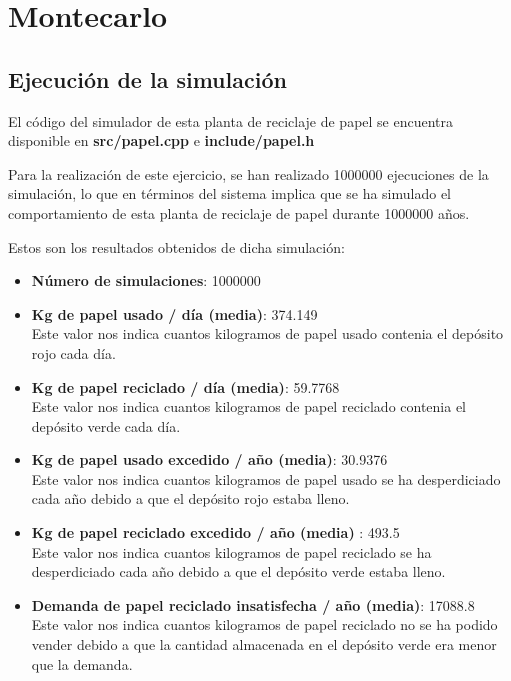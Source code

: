 \chapter{Montecarlo}

\section{Ejecución de la simulación}

El código del simulador de esta planta de reciclaje de papel se encuentra disponible en \textbf{src/papel.cpp} e \textbf{include/papel.h}

Para la realización de este ejercicio, se han realizado 1000000 ejecuciones de la simulación, lo que en términos del sistema implica que se ha simulado el comportamiento de esta planta de reciclaje de papel durante 1000000 años.

Estos son los resultados obtenidos de dicha simulación:

\begin{itemize}
	\item \textbf{Número de simulaciones}: 1000000
	\item \textbf{Kg de papel usado / día (media)}: 374.149\\
		Este valor nos indica cuantos kilogramos de papel usado contenia el depósito rojo cada día.
	\item \textbf{Kg de papel reciclado / día (media)}: 59.7768\\
		Este valor nos indica cuantos kilogramos de papel reciclado contenia el depósito verde cada día.
	\item \textbf{Kg de papel usado excedido / año (media)}: 30.9376\\
		Este valor nos indica cuantos kilogramos de papel usado se ha desperdiciado cada año debido a que el depósito rojo estaba lleno.
	\item \textbf{Kg de papel reciclado excedido / año (media) }: 493.5\\
		Este valor nos indica cuantos kilogramos de papel reciclado se ha desperdiciado cada año debido a que el depósito verde estaba lleno.
	\item \textbf{Demanda de papel reciclado insatisfecha / año (media)}: 17088.8\\
		Este valor nos indica cuantos kilogramos de papel reciclado no se ha podido vender debido a que la cantidad almacenada en el depósito verde era menor que la demanda.
\end{itemize}

